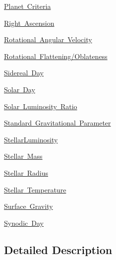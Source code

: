 \begin{DoxyCompactItemize}
\item 
\mbox{\hyperlink{group___e_g_x_phys-_planet_criteria}{Planet Criteria}}
\item 
\mbox{\hyperlink{group___e_g_x_phys-_astrophysics-_right_ascension}{Right Ascension}}
\item 
\mbox{\hyperlink{group___e_g_x_phys-_astrophysics-_rotational_angular_velocity}{Rotational Angular Velocity}}
\item 
\mbox{\hyperlink{group___e_g_x_phys-_astrophysics-_rotational_flattening}{Rotational Flattening/\+Oblateness}}
\item 
\mbox{\hyperlink{group___e_g_x_phys-_astrophysic-_sidereal_day}{Sidereal Day}}
\item 
\mbox{\hyperlink{group___e_g_x_phys-_astrophysic-_solar_day}{Solar Day}}
\item 
\mbox{\hyperlink{group___e_g_x_phys-_astrophysics-_solar_luminosity_ratio}{Solar Luminosity Ratio}}
\item 
\mbox{\hyperlink{group___e_g_x_phys-_astrophysics-_standard_gravitational_parameter}{Standard Gravitational Parameter}}
\item 
\mbox{\hyperlink{group___e_g_x_phys-_astrophysics-_stellar_luminosity}{Stellar\+Luminosity}}
\item 
\mbox{\hyperlink{group___e_g_x_phys-_stellar_mass}{Stellar Mass}}
\item 
\mbox{\hyperlink{group___e_g_x_phys-_stellar_radius}{Stellar Radius}}
\item 
\mbox{\hyperlink{group___e_g_x_phys-_stellar_temperature}{Stellar Temperature}}
\item 
\mbox{\hyperlink{group___e_g_x_phys-_astrophysics-_surface_gravity}{Surface Gravity}}
\item 
\mbox{\hyperlink{group___e_g_x_phys-_astrophysic-_synodic_day}{Synodic Day}}
\end{DoxyCompactItemize}


\subsection{Detailed Description}
